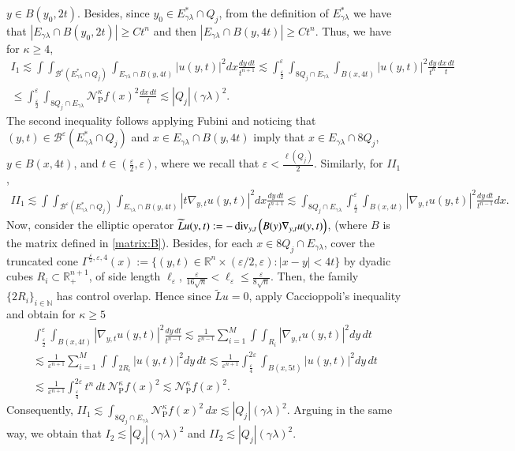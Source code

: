 \documentclass[11pt, a4paper,leqno]{amsart}
\theoremstyle{plain}
\theoremstyle{definition}
\theoremstyle{remark}
\numberwithin{equation}{section}
\def \R{ \mathbb{R} }
\def \N{ \mathbb{N} }
\def \pp{ \mathrm{P} }
\def \Ncal { \mathcal{N} }
\def \iint{\int\!\!\!\int}
\def\div{\mathop{\rm div}}
\begin{document}
$y\in B(y_0,2t)$. Besides, since $y_0\in E^*_{\gamma\lambda}\cap Q_j$, from the definition of
$E^*_{\gamma\lambda}$ we have that $|E_{\gamma\lambda}\cap B(y_0,2t)|\geq Ct^n$ and then
$|E_{\gamma\lambda}\cap B(y,4t)|\geq Ct^n$. Thus, we have for $\kappa\geq 4$,
\begin{multline*}
I_1
\lesssim \iint_{\mathcal{B}^{\varepsilon}(E^*_{\gamma\lambda}\cap Q_j)}\int_{E_{\gamma\lambda}\cap B(y,4t)}|u(y,t)|^2dx\frac{dy \, dt}{t^{n+1}}
\lesssim \int_{\frac{\varepsilon}{2}}^{\varepsilon}\int_{8Q_j\cap E_{\gamma\lambda}}\int_{ B(x,4t)}|u(y,t)|^2\frac{dy}{t^{n}}\frac{dx \, dt}{t}
\\
\leq \int_{\frac{\varepsilon}{2}}^{\varepsilon}\int_{8Q_j\cap E_{\gamma\lambda}}\Ncal_{\pp}^{\kappa}f(x)^2\frac{dx \, dt}{t}
\lesssim |Q_j|(\gamma\lambda)^2.
\end{multline*}
The second inequality follows applying Fubini and noticing that 
$(y,t)\in \mathcal{B}^{\varepsilon}(E^*_{\gamma\lambda}\cap Q_j)$ and $x\in E_{\gamma\lambda}\cap B(y,4t)$ imply that  $x\in E_{\gamma\lambda}\cap 8Q_j$, $y\in B(x,4t)$, and $t\in \left(\frac{\varepsilon}{2},\varepsilon\right)$, where we recall that $\varepsilon<\frac{\ell(Q_j)}{2}$. 
Similarly, for $II_1$,
\begin{align*}
II_1\lesssim \iint_{\mathcal{B}^{\varepsilon}(E^*_{\gamma\lambda}\cap Q_j)}\int_{E_{\gamma\lambda}\cap B(y,4t)}|t\nabla_{y,t}u(y,t)|^2dx\frac{dy \, dt}{t^{n+1}}
\lesssim \int_{8Q_j\cap E_{\gamma\lambda}}\int_{\frac{\varepsilon}{2}}^{\varepsilon}\int_{ B(x,4t)}|\nabla_{y,t}u(y,t)|^2\frac{dy \, dt}{t^{n-1}}dx.
\end{align*}
Now, consider the elliptic operator $\widetilde{L}u(y,t):=-\div_{y,t}\left(B(y)\nabla_{y,t}u(y,t)\right)$, (where $B$ is the matrix defined in \eqref{matrix:B}). Besides, for each $x\in 8Q_j\cap E_{\gamma\lambda}$, cover the truncated cone $\Gamma^{\frac{\varepsilon}{2},\varepsilon,4}(x)
:=\{(y,t)\in \R^{n}\times (\varepsilon/2,\varepsilon): |x-y|<4t\}$ by dyadic cubes $R_i\subset \R^{n+1}_+$, of side length $\ell_{\varepsilon}$, $\frac{\varepsilon}{16\sqrt{n}}<\ell_{\varepsilon}\leq \frac{\varepsilon}{8\sqrt{n}}$. Then, the family $\{2R_i\}_{i\in \N}$ has control overlap.
Hence
since $\widetilde{L}u=0$, apply Caccioppoli's inequality and obtain for $\kappa\geq 5$
\begin{multline*}
\int_{\frac{\varepsilon}{2}}^{\varepsilon}\int_{ B(x,4t)}|\nabla_{y,t}u(y,t)|^2\frac{dy \, dt}{t^{n-1}}
\lesssim \frac{1}{\varepsilon^{n-1}}\sum_{i=1}^{M}\iint_{R_i}
|\nabla_{y,t}u(y,t)|^2dy \, dt
\\
\lesssim \frac{1}{\varepsilon^{n+1}}\sum_{i=1}^M\iint_{2R_i}
|u(y,t)|^2dy \, dt
\lesssim \frac{1}{\varepsilon^{n+1}}\int_{\frac{\varepsilon}{4}}^{2\varepsilon}\int_{B(x,5t)}
|u(y,t)|^2 dy \, dt
\\
\lesssim
 \frac{1}{\varepsilon^{n+1}}\int_{\frac{\varepsilon}{4}}^{2\varepsilon}t^n\,dt\,\Ncal_{\pp}^{\kappa}f(x)^2\lesssim
\Ncal_{\pp}^{\kappa}f(x)^2.
\end{multline*}
Consequently,
$
II_1\lesssim \int_{8Q_j\cap E_{\gamma\lambda}}\Ncal_{\pp}^{\kappa}f(x)^2 \, dx\lesssim |Q_j|(\gamma\lambda)^2.
$
Arguing in the same way, we obtain that $
I_2\lesssim |Q_j|(\gamma\lambda)^2$ and $II_2\lesssim  |Q_j|(\gamma\lambda)^2.$
\end{document}
